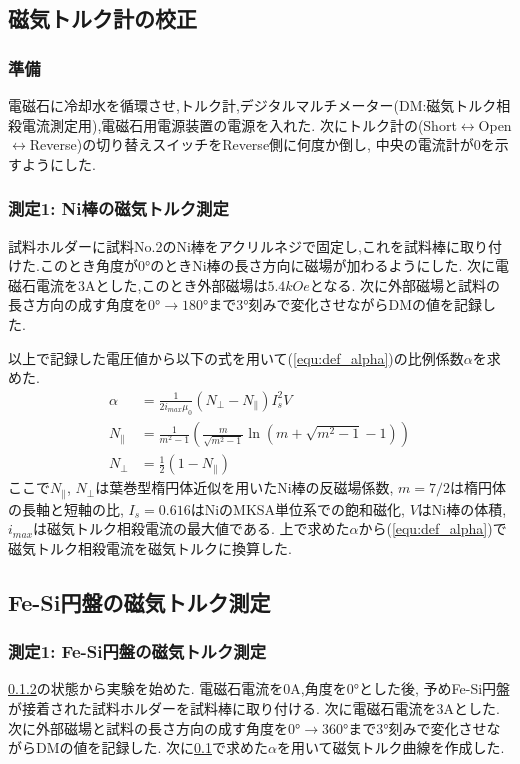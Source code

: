 \subsection{磁気トルク計の校正}
\label{subsec:torque_adjust}
\subsubsection{準備}
\label{subsubsec:torque_junbi}
電磁石に冷却水を循環させ,トルク計,デジタルマルチメーター(DM:磁気トルク相殺電流測定用),電磁石用電源装置の電源を入れた.
次にトルク計の(Short$\leftrightarrow$Open$\leftrightarrow$Reverse)の切り替えスイッチをReverse側に何度か倒し,
中央の電流計が0を示すようにした.
\subsubsection{測定1: Ni棒の磁気トルク測定}
\label{subsubsec:torque_adjust}
試料ホルダーに試料No.2のNi棒をアクリルネジで固定し,これを試料棒に取り付けた.このとき角度が$0\si{\degree}$のときNi棒の長さ方向に磁場が加わるようにした.
次に電磁石電流を$3\si{\ampere}$とした,このとき外部磁場は$5.4\si{kOe}$となる.
次に外部磁場と試料の長さ方向の成す角度を$0\si{\degree}\rightarrow180\si{\degree}$まで$3\si{\degree}$刻みで変化させながらDMの値を記録した.

以上で記録した電圧値から以下の式を用いて(\ref{equ:def_alpha})の比例係数$\alpha$を求めた.
\begin{align}
  \alpha&=\frac{1}{2i_{max}\mu_0}(N_{\perp}-N_{\parallel})I_s^2V\\
  N_{\parallel}&=\frac{1}{m^2-1}\left(\frac{m}{\sqrt{m^2-1}}\ln(m+\sqrt{m^2-1}-1)\right)\\
  N_{\perp}&=\frac{1}{2}(1-N_{\parallel})
\end{align}
ここで$N_{\parallel}$, $N_{\perp}$は葉巻型楕円体近似を用いたNi棒の反磁場係数, $m=7/2$は楕円体の長軸と短軸の比, 
$I_s=0.616$はNiのMKSA単位系での飽和磁化, $V$はNi棒の体積, $i_{max}$は磁気トルク相殺電流の最大値である.
上で求めた$\alpha$から(\ref{equ:def_alpha})で磁気トルク相殺電流を磁気トルクに換算した.
\subsection{Fe-Si円盤の磁気トルク測定}
\subsubsection{測定1: Fe-Si円盤の磁気トルク測定}
\label{subsubsec:Fe-Si}
\ref{subsubsec:torque_adjust}の状態から実験を始めた.
電磁石電流を$0\si{\ampere}$,角度を$0\si{\degree}$とした後,
予めFe-Si円盤が接着された試料ホルダーを試料棒に取り付ける.
次に電磁石電流を$3\si{\ampere}$とした.
次に外部磁場と試料の長さ方向の成す角度を$0\si{\degree}\rightarrow360\si{\degree}$まで$3\si{\degree}$刻みで変化させながらDMの値を記録した.
次に\ref{subsec:torque_adjust}で求めた$\alpha$を用いて磁気トルク曲線を作成した.